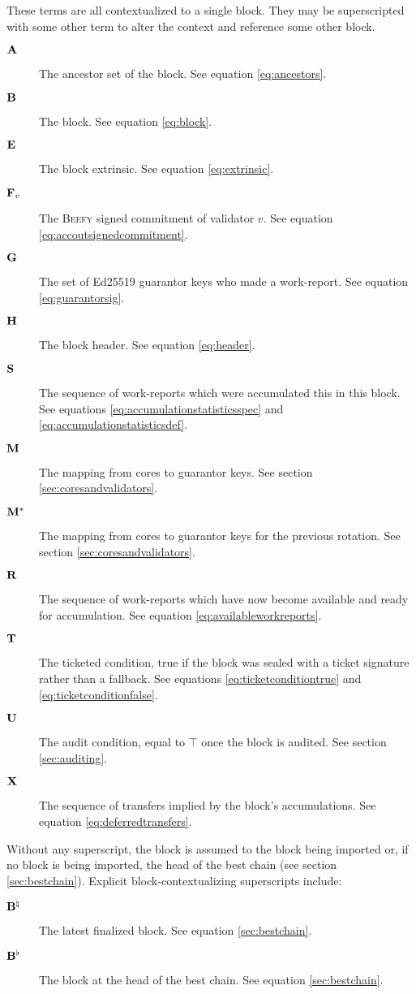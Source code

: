 These terms are all contextualized to a single block. They may be superscripted with some other term to alter the context and reference some other block.
\begin{description}
  \item[$\mathbf{A}$] The ancestor set of the block. See equation \ref{eq:ancestors}.
  \item[$\mathbf{B}$] The block. See equation \ref{eq:block}.
  \item[$\mathbf{E}$] The block extrinsic. See equation \ref{eq:extrinsic}.
  \item[$\mathbf{F}_{v}$] The \textsc{Beefy} signed commitment of validator $v$. See equation \ref{eq:accoutsignedcommitment}.
  \item[$\mathbf{G}$] The set of Ed25519 guarantor keys who made a work-report. See equation \ref{eq:guarantorsig}.
  \item[$\mathbf{H}$] The block header. See equation \ref{eq:header}.
  \item[$\mathbf{S}$] The sequence of work-reports which were accumulated this in this block. See equations \ref{eq:accumulationstatisticsspec} and \ref{eq:accumulationstatisticsdef}.
  \item[$\mathbf{M}$] The mapping from cores to guarantor keys. See section \ref{sec:coresandvalidators}.
  \item[$\mathbf{M}^*$] The mapping from cores to guarantor keys for the previous rotation. See section \ref{sec:coresandvalidators}.
  \item[$\mathbf{R}$] The sequence of work-reports which have now become available and ready for accumulation. See equation \ref{eq:availableworkreports}.
  \item[$\mathbf{T}$] The ticketed condition, true if the block was sealed with a ticket signature rather than a fallback. See equations \ref{eq:ticketconditiontrue} and \ref{eq:ticketconditionfalse}.
  \item[$\mathbf{U}$] The audit condition, equal to $\top$ once the block is audited. See section \ref{sec:auditing}.
  \item[$\mathbf{X}$] The sequence of transfers implied by the block's accumulations. See equation \ref{eq:deferredtransfers}.
\end{description}

Without any superscript, the block is assumed to the block being imported or, if no block is being imported, the head of the best chain (see section \ref{sec:bestchain}). Explicit block-contextualizing superscripts include:
\begin{description}
  \item[$\mathbf{B}^\natural$] The latest finalized block. See equation \ref{sec:bestchain}.
  \item[$\mathbf{B}^\flat$] The block at the head of the best chain. See equation \ref{sec:bestchain}.
\end{description}

